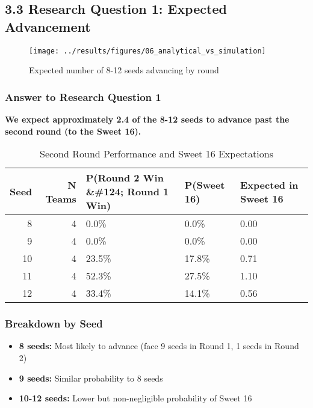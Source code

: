 \documentclass[
]{article}
\providecommand{\tightlist}{%
  \setlength{\itemsep}{0pt}\setlength{\parskip}{0pt}}
\begin{document}
\subsection{3.3 Research Question 1: Expected
Advancement}\label{research-question-1-expected-advancement}

\begin{figure}

{\centering \texttt{[image: ../results/figures/06\_analytical\_vs\_simulation]} 

}

\caption{Expected number of 8-12 seeds advancing by round}\label{fig:advancement-plot}
\end{figure}

\subsubsection{Answer to Research Question
1}\label{answer-to-research-question-1}

\textbf{We expect approximately 2.4 of the 8-12 seeds to advance past
the second round (to the Sweet 16).}

\begin{longtable}[t]{rrlll}
\caption{\label{tab:advancement-table}Second Round Performance and Sweet 16 Expectations}\\
\toprule
Seed & N Teams & P(Round 2 Win \&\#124; Round 1 Win) & P(Sweet 16) & Expected in Sweet 16\\
\midrule
8 & 4 & 0.0\% & 0.0\% & 0.00\\
9 & 4 & 0.0\% & 0.0\% & 0.00\\
10 & 4 & 23.5\% & 17.8\% & 0.71\\
11 & 4 & 52.3\% & 27.5\% & 1.10\\
12 & 4 & 33.4\% & 14.1\% & 0.56\\
\bottomrule
\end{longtable}

\subsubsection{Breakdown by Seed}\label{breakdown-by-seed}

\begin{itemize}
\tightlist
\item
  \textbf{8 seeds:} Most likely to advance (face 9 seeds in Round 1, 1
  seeds in Round 2)
\item
  \textbf{9 seeds:} Similar probability to 8 seeds
\item
  \textbf{10-12 seeds:} Lower but non-negligible probability of Sweet 16
\end{itemize}
\end{document}

